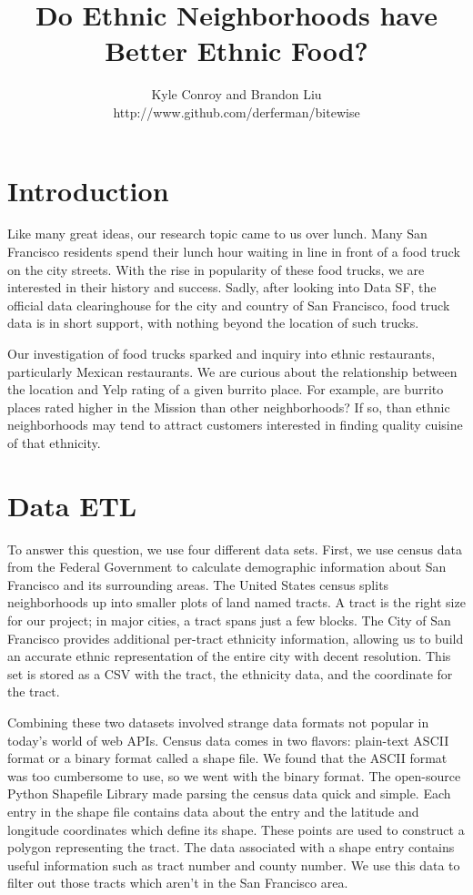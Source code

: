 \documentclass[11pt,twocolumn]{article}
\author{Kyle Conroy and Brandon Liu\\
http://www.github.com/derferman/bitewise}
\title{Do Ethnic Neighborhoods have Better Ethnic Food?}
\begin{document}
\maketitle

\section{Introduction}

Like many great ideas, our research topic came to us over lunch. Many San Francisco residents spend their lunch hour waiting in line in front of a food truck on the city streets. With the rise in popularity of these food trucks, we are interested in their history and success. Sadly, after looking into Data SF, the official data clearinghouse for the city and country of San Francisco, food truck data is in short support, with nothing beyond the location of such trucks.

Our investigation of food trucks sparked and inquiry into ethnic restaurants, particularly Mexican restaurants. We are curious about the relationship between the location and Yelp rating of a given burrito place. For example, are burrito places rated higher in the Mission than other neighborhoods? If so, than ethnic neighborhoods may tend to attract customers interested in finding quality cuisine of that ethnicity.

\section{Data ETL}

To answer this question, we use four different data sets. First, we use census data from the Federal Government to calculate demographic information about San Francisco and its surrounding areas. The United States census splits neighborhoods up into smaller plots of land named tracts. A tract is the right size for our project; in major cities, a tract spans just a few blocks. The City of San Francisco provides additional per-tract ethnicity information, allowing us to build an accurate ethnic representation of the entire city with decent resolution. This set is stored as a CSV with the tract, the ethnicity data, and the coordinate for the tract.

Combining these two datasets involved strange data formats not popular in today's world of web APIs. Census data comes in two flavors: plain-text ASCII format or a binary format called a shape file. We found that the ASCII format was too cumbersome to use, so we went with the binary format. The open-source Python Shapefile Library made parsing the census data quick and simple. Each entry in the shape file contains data about the entry and the latitude and longitude coordinates which define its shape. These points are used to construct a polygon representing the tract. The data associated with a shape entry contains useful information such as tract number and county number. We use this data to filter out those tracts which aren't in the San Francisco area.
\end{document}
